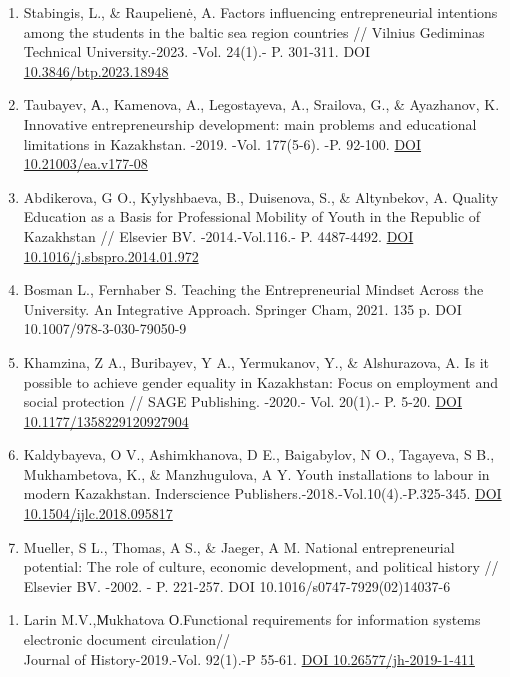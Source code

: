\begin{references}
\begin{enumerate}
\def\labelenumi{\arabic{enumi}.}
\setcounter{enumi}{3}
\item
  Stabingis, L., \& Raupelienė, A. Factors influencing entrepreneurial
  intentions among the students in the baltic sea region countries //
  Vilnius Gediminas Technical University.-2023. -Vol. 24(1).- P.
  301-311. DOI
  \href{https://doi.org/10.3846/btp.2023.18948}{10.3846/btp.2023.18948}
\item
  Taubayev, А., Kamenova, A., Legostayeva, A., Srailova, G., \&
  Ayazhanov, K. Innovative entrepreneurship development: main problems
  and educational limitations in Kazakhstan. -2019. -Vol. 177(5-6). -P.
  92-100. \href{https://doi.org/10.21003/ea.v177-08}{DOI
  10.21003/ea.v177-08}
\item
  Abdikerova, G O., Kylyshbaeva, B., Duisenova, S., \& Altynbekov, A.
  Quality Education as a Basis for Professional Mobility of Youth in the
  Republic of Kazakhstan // Elsevier BV. -2014.-Vol.116.- P. 4487-4492.
  \href{https://doi.org/10.1016/j.sbspro.2014.01.972}{DOI
  10.1016/j.sbspro.2014.01.972}
\item
  Bosman L., Fernhaber S. Teaching the Entrepreneurial Mindset Across
  the University. An Integrative Approach. Springer Cham, 2021. 135 p.
  DOI 10.1007/978-3-030-79050-9
\item
  Khamzina, Z A., Buribayev, Y A., Yermukanov, Y., \& Alshurazova, A. Is
  it possible to achieve gender equality in Kazakhstan: Focus on
  employment and social protection // SAGE Publishing. -2020.- Vol.
  20(1).- P. 5-20. \href{https://doi.org/10.1177/1358229120927904}{DOI
  10.1177/1358229120927904}
\item
  Kaldybayeva, O V., Ashimkhanova, D E., Baigabylov, N O., Tagayeva, S
  B., Mukhambetova, K., \& Manzhugulova, A Y. Youth installations to
  labour in modern Kazakhstan. Inderscience
  Publishers.-2018.-Vol.10(4).-P.325-345.
  \href{https://doi.org/10.1504/ijlc.2018.095817}{DOI
  10.1504/ijlc.2018.095817}
\item
  Mueller, S L., Thomas, A S., \& Jaeger, A M. National entrepreneurial
  potential: The role of culture, economic development, and political
  history // Elsevier BV. -2002. - P. 221-257.
  DOI 10.1016/s0747-7929(02)14037-6
\end{enumerate}


\begin{enumerate}
\def\labelenumi{\arabic{enumi}.}
\setcounter{enumi}{10}
\item
  Larin M.V.,Мukhatova О.Functional requirements for information systems
  electronic document circulation//\\Journal of History-2019.-Vol.
  92(1).-P 55-61. \href{https://doi.org/10.26577/jh-2019-1-411}{DOI
  10.26577/jh-2019-1-411}
\end{enumerate}
\end{references}
